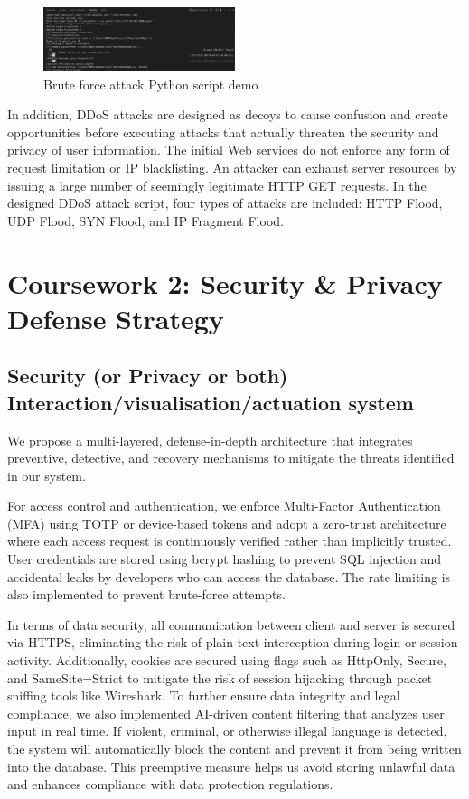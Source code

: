 \documentclass{article}
\begin{document}
\begin{figure}[htb]
    \centering
    \includegraphics[width=0.5\textwidth]{images/Brute_force_attack_Python_script_demo.png}
    \caption{Brute force attack Python script demo}
    \label{fig:brute_force_attack}
\end{figure}

In addition, DDoS attacks are designed as decoys to cause confusion and create opportunities before executing attacks that actually threaten the security and privacy of user information. The initial Web services do not enforce any form of request limitation or IP blacklisting. An attacker can exhaust server resources by issuing a large number of seemingly legitimate HTTP GET requests. In the designed DDoS attack script, four types of attacks are included: HTTP Flood, UDP Flood, SYN Flood, and IP Fragment Flood.








\section{Coursework 2: Security \& Privacy Defense Strategy}
\subsection{Security (or Privacy or both) Interaction/visualisation/actuation system}
We propose a multi-layered, defense-in-depth architecture that integrates preventive, detective, and recovery mechanisms to mitigate the threats identified in our system.

For access control and authentication, we enforce Multi-Factor Authentication (MFA) using TOTP or device-based tokens and adopt a zero-trust architecture where each access request is continuously verified rather than implicitly trusted. User credentials are stored using bcrypt hashing to prevent SQL injection and accidental leaks by developers who can access the database. The rate limiting is also implemented to prevent brute-force attempts.

In terms of data security, all communication between client and server is secured via HTTPS, eliminating the risk of plain-text interception during login or session activity. Additionally, cookies are secured using flags such as HttpOnly, Secure, and SameSite=Strict to mitigate the risk of session hijacking through packet sniffing tools like Wireshark. To further ensure data integrity and legal compliance, we also implemented AI-driven content filtering that analyzes user input in real time. If violent, criminal, or otherwise illegal language is detected, the system will automatically block the content and prevent it from being written into the database. This preemptive measure helps us avoid storing unlawful data and enhances compliance with data protection regulations.
\end{document}
